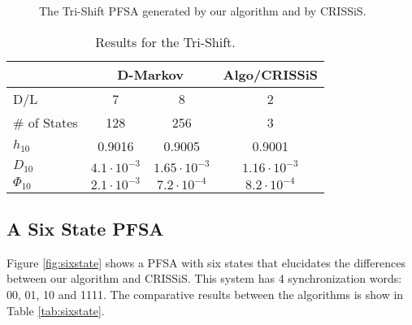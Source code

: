 {\begin{figure}
\centering
{}
\caption{The Tri-Shift PFSA generated by our algorithm and by CRISSiS.\label{fig:trishiftgen}}
\end{figure}

\begin{table}
\centering
\begin{tabular}{|l|c|c|c|}
\hline
 & \multicolumn{2}{c|}{\textbf{D-Markov}} & \textbf{Algo/CRISSiS}\\
 \hline
D/L & 7 & 8 & 2 \\
\hline
\# of States & 128 & 256 & 3 \\ 
$h_{10}$ & 0.9016 & 0.9005 & 0.9001 \\
$D_{10}$ & $4.1\cdot10^{-3}$ & $1.65\cdot10^{-3}$ & $1.16\cdot10^{-3}$ \\
$\Phi_{10}$ & $2.1\cdot10^{-3}$ & $7.2\cdot10^{-4}$ & $8.2\cdot10^{-4}$ \\
 \hline
\end{tabular}
\caption{Results for the Tri-Shift. \label{tab:trishift}}
\end{table}

\subsection{A Six State PFSA}

Figure \ref{fig:sixstate} shows a PFSA with six states that elucidates the differences between our algorithm and CRISSiS. This system has 4 synchronization words: 00, 01, 10 and 1111. The comparative results between the algorithms is show in Table \ref{tab:sixstate}.

}

